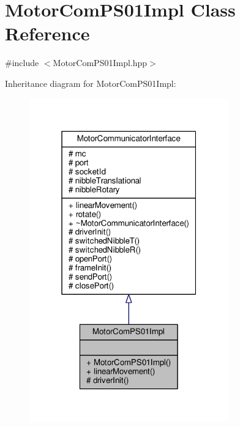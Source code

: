 \hypertarget{class_motor_com_p_s01_impl}{}\section{Motor\+Com\+P\+S01\+Impl Class Reference}
\label{class_motor_com_p_s01_impl}


{\ttfamily \#include $<$Motor\+Com\+P\+S01\+Impl.\+hpp$>$}



Inheritance diagram for Motor\+Com\+P\+S01\+Impl\+:\nopagebreak
\begin{figure}[H]
\begin{center}
\leavevmode
\includegraphics[width=244pt]{class_motor_com_p_s01_impl__inherit__graph}
\end{center}
\end{figure}


